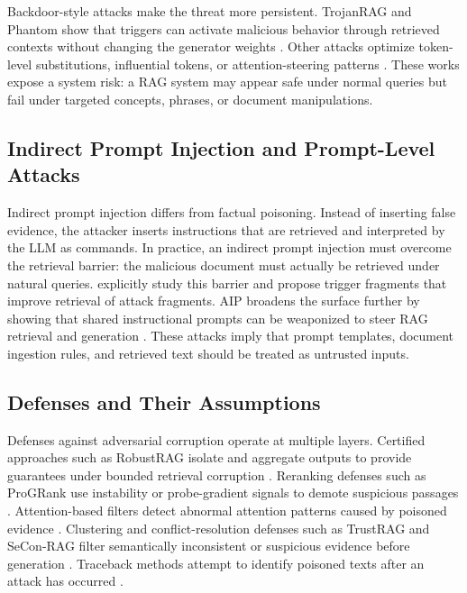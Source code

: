 \documentclass[11pt]{article}
\begin{document}
Backdoor-style attacks make the threat more persistent. TrojanRAG and Phantom show that triggers can activate malicious behavior through retrieved contexts without changing the generator weights \citep{trojanRAG2024,phantom2024}. Other attacks optimize token-level substitutions, influential tokens, or attention-steering patterns \citep{rrag050,rrag052,rrag120}. These works expose a system risk: a RAG system may appear safe under normal queries but fail under targeted concepts, phrases, or document manipulations.

\subsection{Indirect Prompt Injection and Prompt-Level Attacks}

Indirect prompt injection differs from factual poisoning. Instead of inserting false evidence, the attacker inserts instructions that are retrieved and interpreted by the LLM as commands. In practice, an indirect prompt injection must overcome the retrieval barrier: the malicious document must actually be retrieved under natural queries. \citet{rrag005} explicitly study this barrier and propose trigger fragments that improve retrieval of attack fragments. AIP broadens the surface further by showing that shared instructional prompts can be weaponized to steer RAG retrieval and generation \citep{aip2025}. These attacks imply that prompt templates, document ingestion rules, and retrieved text should be treated as untrusted inputs.

\subsection{Defenses and Their Assumptions}

Defenses against adversarial corruption operate at multiple layers. Certified approaches such as RobustRAG isolate and aggregate outputs to provide guarantees under bounded retrieval corruption \citep{certifiedRAG2024}. Reranking defenses such as ProGRank use instability or probe-gradient signals to demote suspicious passages \citep{rrag004}. Attention-based filters detect abnormal attention patterns caused by poisoned evidence \citep{rrag015}. Clustering and conflict-resolution defenses such as TrustRAG and SeCon-RAG filter semantically inconsistent or suspicious evidence before generation \citep{rrag013,rrag017}. Traceback methods attempt to identify poisoned texts after an attack has occurred \citep{rrag128}.
\end{document}
